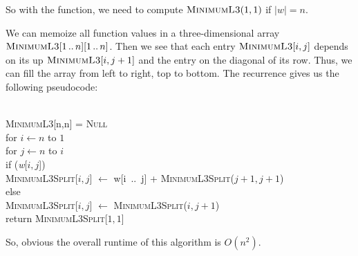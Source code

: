 \documentclass[11pt]{article}
\newcommand{\IsSinL}{\text{IsStringInL}}
\begin{document}
\begin{solution}
	So with the function, we need to compute $\textsc{MinimumL3}(1, 1)$ if $|w| = n$.
	
	We can memoize all function values in a three-dimensional array $\textsc{MinimumL3}[1\, ..\,n][1\,..\,n]$. Then we see that each entry $\textsc{MinimumL3}[i, j]$ depends on its up $\textsc{MinimumL3}[i, j + 1]$ and the entry on the diagonal of its row. Thus, we can fill the array from left to right, top to bottom. The recurrence gives us the following pseudocode:
	
		\begin{center}
			\begin{algorithm}
				\+
				\\	\textsc{MinimumL3}[n,n] = \textsc{Null}
				\\	for $i \gets n$ to $1$\+
				\\		for $j \gets n$ to $i$\+
				\\			if \IsSinL(\textit{w}[$i,j$])\+
				\\				 \textsc{MinimumL3Split}[$i,j$] $\gets$ w[i\, ..\, j] + \textsc{MinimumL3Split}(\textit{$j+1, j+1$})\-
				\\			else\+
				\\				\textsc{MinimumL3Split}[$i,j$] $\gets$ \textsc{MinimumL3Split}(\textit{$i, j + 1$})\-\-\-
				\\ return \textsc{MinimumL3Split}[$1,1$]
			\end{algorithm}
		\end{center}
	
	So, obvious the overall runtime of this algorithm is $O(n^2)$.
	
\end{solution}
\clearpage
\end{document}
